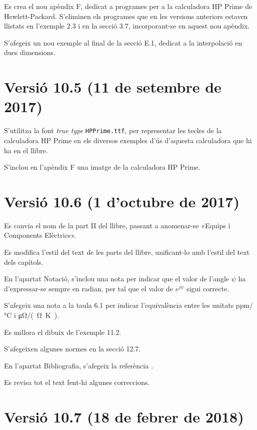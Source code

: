 Es crea el nou apèndix F, dedicat a programes per a la calculadora \textsf{HP Prime} de Hewlett-Packard. S'eliminen els programes que en les versions anteriors estaven llistats en l'exemple 2.3 i en la secció 3.7, incorporant-se en aquest nou apèndix.

S'afegeix un nou exemple al final de la secció E.1, dedicat  a la interpolació en dues dimensions.

\section*{Versió 10.5 (11 de setembre de 2017)}

S'utilitza la font \textit{true type} \texttt{HPPrime.ttf}, per representar les tecles de la calculadora \textsf{HP Prime} en els diversos exemples d'ús d'aquesta calculadora que hi ha en el llibre.

S'inclou en l'apèndix F una imatge de la calculadora \textsf{HP Prime}.


\section*{Versió 10.6 (1 d'octubre de 2017)}

Es canvia el nom de la part II del llibre, passant a anomenar-se «Equips i Components Elèctrics».

Es modifica l'estil del text de les parts del llibre, unificant-lo amb l'estil del text dels capítols.

En l'apartat Notació, s'inclou una nota per indicar  que el valor de l'angle $\psi$ ha d'expressar-se sempre en radian, per tal que el valor de $e^{j\psi}$ sigui correcte.

S'afegeix una nota a la taula 6.1 per indicar l'equivalència entre les unitats \unit{ppm/\degreeCelsius}  i \unit{\micro\ohm/(\ohm.\kelvin)}.

Es millora el dibuix de l'exemple 11.2.

S’afegeixen algunes normes en la secció 12.7.

En l'apartat Bibliografia, s'afegeix la referència \cite{BUR}.

Es revisa tot el text fent-hi algunes correccions.


\section*{Versió 10.7 (18 de febrer de 2018)}

